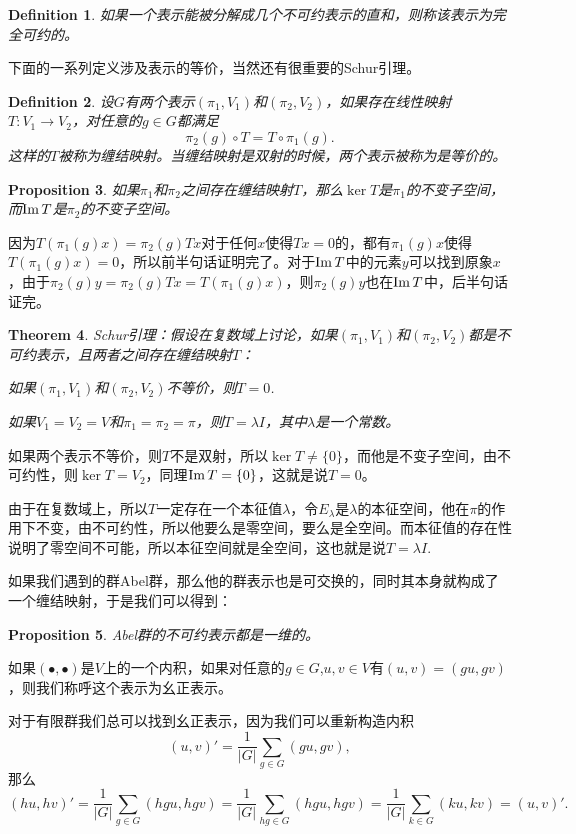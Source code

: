 \documentclass[8pt]{book}
\theoremstyle{plain}
\newtheorem{defi}{Definition}
\newtheorem{pro}[defi]{Proposition}
\newtheorem{theo}[defi]{Theorem}
\begin{document}
\begin{defi}
如果一个表示能被分解成几个不可约表示的直和，则称该表示为完全可约的。
\end{defi}
下面的一系列定义涉及表示的等价，当然还有很重要的Schur引理。
\begin{defi}
设$G$有两个表示$(\pi_1,V_1)$和$(\pi_2,V_2)$，如果存在线性映射$T:V_1\to V_2$，对任意的$g\in G$都满足
\[
\pi_2(g)\circ T=T\circ \pi_1(g).
\]
这样的$T$被称为缠结映射。当缠结映射是双射的时候，两个表示被称为是等价的。
\end{defi}
\begin{pro}
如果$\pi_1$和$\pi_2$之间存在缠结映射$T$，那么$\ker T$是$\pi_1$的不变子空间，而$\operatorname{Im} T$是$\pi_2$的不变子空间。
\end{pro}
因为$T(\pi_1(g)x)=\pi_2(g)Tx$对于任何$x$使得$Tx=0$的，都有$\pi_1(g)x$使得$T(\pi_1(g)x)=0$，所以前半句话证明完了。对于$\operatorname{Im} T$中的元素$y$可以找到原象$x$，由于$\pi_2(g)y=\pi_2(g)Tx=T(\pi_1(g)x)$，则$\pi_2(g)y$也在$\operatorname{Im} T$中，后半句话证完。
\begin{theo}
Schur引理：假设在复数域上讨论，如果$(\pi_1,V_1)$和$(\pi_2,V_2)$都是不可约表示，且两者之间存在缠结映射$T$：

 如果$(\pi_1,V_1)$和$(\pi_2,V_2)$不等价，则$T=0$.

 如果$V_1=V_2=V$和$\pi_1=\pi_2=\pi$，则$T=\lambda I$，其中$\lambda$是一个常数。
\end{theo}

如果两个表示不等价，则$T$不是双射，所以$\ker T\neq \{0\}$，而他是不变子空间，由不可约性，则$\ker T= V_2$，同理$\operatorname{Im}  T= \{0\}$，这就是说$T=0$。

由于在复数域上，所以$T$一定存在一个本征值$\lambda$，令$E_\lambda$是$\lambda$的本征空间，他在$\pi$的作用下不变，由不可约性，所以他要么是零空间，要么是全空间。而本征值的存在性说明了零空间不可能，所以本征空间就是全空间，这也就是说$T=\lambda I$.

如果我们遇到的群Abel群，那么他的群表示也是可交换的，同时其本身就构成了一个缠结映射，于是我们可以得到：
\begin{pro}
	Abel群的不可约表示都是一维的。
\end{pro}
如果$(\bullet,\bullet)$是$V$上的一个内积，如果对任意的$g\in G$,$u,v\in V$有$(u,v)=(gu,gv)$，则我们称呼这个表示为幺正表示。

对于有限群我们总可以找到幺正表示，因为我们可以重新构造内积
\[
(u,v)'=\frac{1}{|G|}\sum_{g\in G}(gu,gv),
\]
那么
\[
(hu,hv)'=\frac{1}{|G|}\sum_{g\in G}(hgu,hgv)=\frac{1}{|G|}\sum_{hg\in G}(hgu,hgv)=\frac{1}{|G|}\sum_{k\in G}(ku,kv)=(u,v)'.
\]
\end{document}
